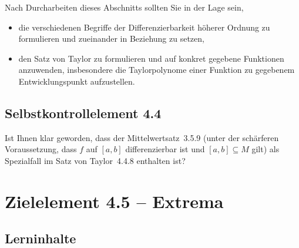 \documentclass[a4paper,12pt]{article}
\begin{document}
Nach Durcharbeiten dieses Abschnitts sollten Sie in der Lage sein,
\begin{itemize}
  \item die verschiedenen Begriffe der Differenzierbarkeit höherer Ordnung zu formulieren
        und zueinander in Beziehung zu setzen,
  \item den Satz von Taylor zu formulieren und auf konkret gegebene Funktionen anzuwenden,
        insbesondere die Taylorpolynome einer Funktion zu gegebenem Entwicklungspunkt
        aufzustellen.
\end{itemize}

\subsection*{Selbstkontrollelement 4.4}

Ist Ihnen klar geworden, dass der Mittelwertsatz~3.5.9 (unter der schärferen
Voraussetzung, dass $f$ auf $[a, b]$ differenzierbar ist und $[a, b] \subseteq M$
gilt) als Spezialfall im Satz von Taylor~4.4.8 enthalten ist?

\newpage

\section*{Zielelement 4.5 -- Extrema}

\subsection*{Lerninhalte}

\begin{center}
\end{center}
\end{document}

